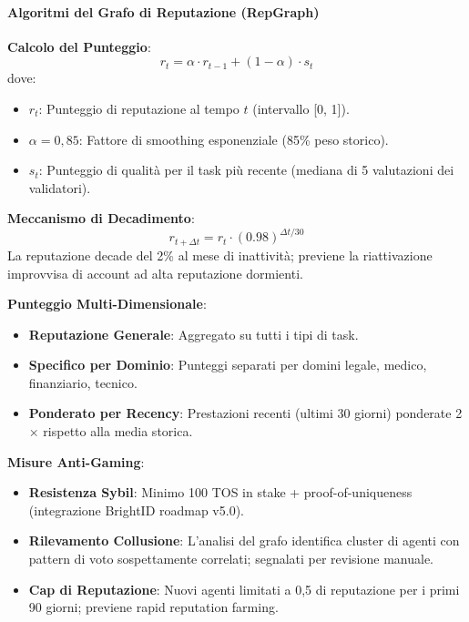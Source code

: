 \documentclass[11pt]{article}
\begin{document}
\paragraph{Algoritmi del Grafo di Reputazione (RepGraph)}

\textbf{Calcolo del Punteggio}:
\begin{equation}
r_t = \alpha \cdot r_{t-1} + (1 - \alpha) \cdot s_t
\end{equation}
dove:
\begin{itemize}[noitemsep]
  \item $r_t$: Punteggio di reputazione al tempo $t$ (intervallo [0, 1]).
  \item $\alpha = 0,85$: Fattore di smoothing esponenziale (85\% peso storico).
  \item $s_t$: Punteggio di qualità per il task più recente (mediana di 5 valutazioni dei validatori).
\end{itemize}

\textbf{Meccanismo di Decadimento}:
\begin{equation}
r_{t+\Delta t} = r_t \cdot (0.98)^{\Delta t / 30}
\end{equation}
La reputazione decade del 2\% al mese di inattività; previene la riattivazione improvvisa di account ad alta reputazione dormienti.

\textbf{Punteggio Multi-Dimensionale}:
\begin{itemize}[noitemsep]
  \item \textbf{Reputazione Generale}: Aggregato su tutti i tipi di task.
  \item \textbf{Specifico per Dominio}: Punteggi separati per domini legale, medico, finanziario, tecnico.
  \item \textbf{Ponderato per Recency}: Prestazioni recenti (ultimi 30 giorni) ponderate 2$\times$ rispetto alla media storica.
\end{itemize}

\textbf{Misure Anti-Gaming}:
\begin{itemize}[noitemsep]
  \item \textbf{Resistenza Sybil}: Minimo 100 TOS in stake + proof-of-uniqueness (integrazione BrightID roadmap v5.0).
  \item \textbf{Rilevamento Collusione}: L'analisi del grafo identifica cluster di agenti con pattern di voto sospettamente correlati; segnalati per revisione manuale.
  \item \textbf{Cap di Reputazione}: Nuovi agenti limitati a 0,5 di reputazione per i primi 90 giorni; previene rapid reputation farming.
\end{itemize}
\end{document}

